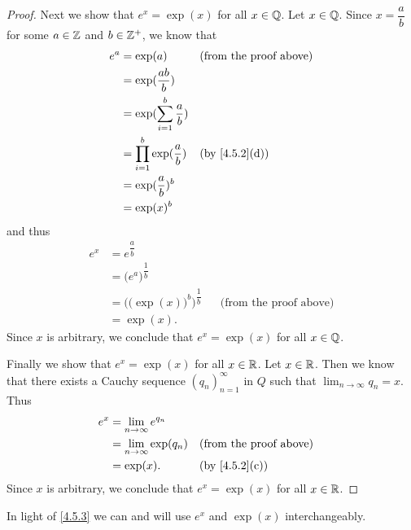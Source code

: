 \begin{proof}
  Next we show that \(e^x = \exp(x)\) for all \(x \in \mathbb{Q}\).
  Let \(x \in \mathbb{Q}\).
  Since \(x = \dfrac{a}{b}\) for some \(a \in \mathbb{Z}\) and \(b \in \mathbb{Z}^+\), we know that
  \begin{align*}
    e^a & = \exp(a)                            &  & \text{(from the proof above)} \\
        & = \exp(\dfrac{ab}{b})                                                   \\
        & = \exp(\sum_{i = 1}^b \dfrac{a}{b})                                     \\
        & = \prod_{i = 1}^b \exp(\dfrac{a}{b}) &  & \text{(by \cref{4.5.2}(d))}   \\
        & = \exp(\dfrac{a}{b})^b                                                  \\
        & = \exp(x)^b
  \end{align*}
  and thus
  \begin{align*}
    e^x & = e^{\dfrac{a}{b}}                                                                \\
        & = \big(e^a\big)^{\dfrac{1}{b}}                                                    \\
        & = \Big(\big(\exp(x)\big)^b\Big)^{\dfrac{1}{b}} &  & \text{(from the proof above)} \\
        & = \exp(x).
  \end{align*}
  Since \(x\) is arbitrary, we conclude that \(e^x = \exp(x)\) for all \(x \in \mathbb{Q}\).

  Finally we show that \(e^x = \exp(x)\) for all \(x \in \mathbb{R}\).
  Let \(x \in \mathbb{R}\).
  Then we know that there exists a Cauchy sequence \((q_n)_{n = 1}^\infty\) in \(Q\) such that \(\lim_{n \to \infty} q_n = x\).
  Thus
  \begin{align*}
    e^x & = \lim_{n \to \infty} e^{q_n}                                      \\
        & = \lim_{n \to \infty} \exp(q_n) &  & \text{(from the proof above)} \\
        & = \exp(x).                      &  & \text{(by \cref{4.5.2}(c))}
  \end{align*}
  Since \(x\) is arbitrary, we conclude that \(e^x = \exp(x)\) for all \(x \in \mathbb{R}\).
\end{proof}

\begin{note}
  In light of \cref{4.5.3} we can and will use \(e^x\) and \(\exp(x)\) interchangeably.
\end{note}

